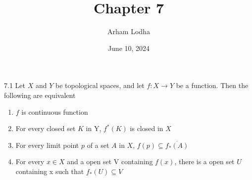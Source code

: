 \documentclass{article}
\newcommand*{\subeq}{\subseteq}
\begin{document}
\title{Chapter 7}
\author{Arham Lodha}%
\date{June 10, 2024}%
\maketitle

\begin{claim}{7.1}\label{Claim 7.1.}
    Let $X$ and $Y$ be topological spaces, and let $f: X \to Y$ be a function. Then the following are equivalent
    
    \begin{enumerate}
        \item $f$ is continuous function
        \item For every closed set $K$ in Y, $f^*(K)$ is closed in $X$
        \item For every limit point $p$ of a set $A$ in $X$, $f(p) \subseteq \overline{f_*(A)}$
        \item For every $x \in X$ and a open set V containing $f(x)$, there is a open set $U$ containing x such that $f_*(U) \subeq V$            
    \end{enumerate}
\end{claim}
\end{document}

